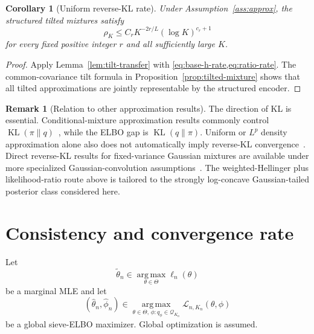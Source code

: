 \documentclass[11pt]{article}
\newtheorem{corollary}[theorem]{Corollary}
\theoremstyle{definition}
\newtheorem{remark}[theorem]{Remark}
\newcommand{\KL}{\operatorname{KL}}
\newcommand{\argmax}{\operatorname*{arg\,max}}
\newcommand{\cL}{\mathcal L}
\newcommand{\cQ}{\mathcal Q}
\begin{document}
\begin{corollary}[Uniform reverse-KL rate]
\label{cor:reverse-kl}
Under Assumption~\ref{ass:approx}, the structured tilted mixtures satisfy
\begin{equation}
\rho_K
\le
C_rK^{-2r/L}(\log K)^{c_r+1}
\label{eq:rho-rate}
\end{equation}
for every fixed positive integer $r$ and all sufficiently large $K$.
\end{corollary}

\begin{proof}
Apply Lemma~\ref{lem:tilt-transfer} with \cref{eq:base-h-rate,eq:ratio-rate}. The common-covariance tilt formula in Proposition~\ref{prop:tilted-mixture} shows that all tilted approximations are jointly representable by the structured encoder.
\end{proof}

\begin{remark}[Relation to other approximation results]
\label{rem:directions}
The direction of KL is essential. Conditional-mixture approximation results commonly control $\KL(\pi\|q)$~\cite{norets2010}, while the ELBO gap is $\KL(q\|\pi)$. Uniform or $L^p$ density approximation alone also does not automatically imply reverse-KL convergence~\cite{nguyen2020}. Direct reverse-KL results for fixed-variance Gaussian mixtures are available under more specialized Gaussian-convolution assumptions~\cite{huix2024}. The weighted-Hellinger plus likelihood-ratio route above is tailored to the strongly log-concave Gaussian-tailed posterior class considered here.
\end{remark}

\section{Consistency and convergence rate}
\label{sec:stats}

Let
\[
\widetilde\theta_n\in\argmax_{\theta\in\Theta}\ell_n(\theta)
\]
be a marginal MLE and let
\[
(\widehat\theta_n,\widehat\phi_n)
\in
\argmax_{\theta\in\Theta,\,\phi:q_\phi\in\cQ_{K_n}}
\cL_{n,K_n}(\theta,\phi)
\]
be a global sieve-ELBO maximizer. Global optimization is assumed.
\end{document}

